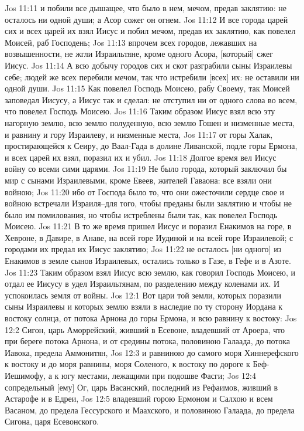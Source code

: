 Jos 11:11  и побили все дышащее, что было в нем, мечом, предав заклятию: не осталось ни одной души; а Асор сожег он огнем.
Jos 11:12  И все города царей сих и всех царей их взял Иисус и побил мечом, предав их заклятию, как повелел Моисей, раб Господень;
Jos 11:13  впрочем всех городов, лежавших на возвышенности, не жгли Израильтяне, кроме одного Асора, [который] сжег Иисус.
Jos 11:14  А всю добычу городов сих и скот разграбили сыны Израилевы себе; людей же всех перебили мечом, так что истребили [всех] их: не оставили ни одной души.
Jos 11:15  Как повелел Господь Моисею, рабу Своему, так Моисей заповедал Иисусу, а Иисус так и сделал: не отступил ни от одного слова во всем, что повелел Господь Моисею.
Jos 11:16  Таким образом Иисус взял всю эту нагорную землю, всю землю полуденную, всю землю Гошен и низменные места, и равнину и гору Израилеву, и низменные места,
Jos 11:17  от горы Халак, простирающейся к Сеиру, до Ваал-Гада в долине Ливанской, подле горы Ермона, и всех царей их взял, поразил их и убил.
Jos 11:18  Долгое время вел Иисус войну со всеми сими царями.
Jos 11:19  Не было города, который заключил бы мир с сынами Израилевыми, кроме Евеев, жителей Гаваона: все взяли они войною;
Jos 11:20  ибо от Господа было то, что они ожесточили сердце свое и войною встречали Израиля--для того, чтобы преданы были заклятию и чтобы не было им помилования, но чтобы истреблены были так, как повелел Господь Моисею.
Jos 11:21  В то же время пришел Иисус и поразил Енакимов на горе, в Хевроне, в Давире, в Анаве, на всей горе Иудиной и на всей горе Израилевой; с городами их предал их Иисус заклятию;
Jos 11:22  не осталось [ни одного] из Енакимов в земле сынов Израилевых, остались только в Газе, в Гефе и в Азоте.
Jos 11:23  Таким образом взял Иисус всю землю, как говорил Господь Моисею, и отдал ее Иисусу в удел Израильтянам, по разделению между коленами их. И успокоилась земля от войны.
Jos 12:1  Вот цари той земли, которых поразили сыны Израилевы и которых землю взяли в наследие по ту сторону Иордана к востоку солнца, от потока Арнона до горы Ермона, и всю равнину к востоку:
Jos 12:2  Сигон, царь Аморрейский, живший в Есевоне, владевший от Ароера, что при береге потока Арнона, и от средины потока, половиною Галаада, до потока Иавока, предела Аммонитян,
Jos 12:3  и равниною до самого моря Хиннерефского к востоку и до моря равнины, моря Соленого, к востоку по дороге к Беф-Иешимофу, а к югу местами, лежащими при подошве Фасги;
Jos 12:4  сопредельный [ему] Ог, царь Васанский, последний из Рефаимов, живший в Астарофе и в Едреи,
Jos 12:5  владевший горою Ермоном и Салхою и всем Васаном, до предела Гессурского и Маахского, и половиною Галаада, до предела Сигона, царя Есевонского.
